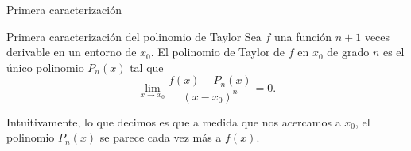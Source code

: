 \begin{frame}{Primera caracterización}
  \begin{exampleblock}{Primera caracterización del polinomio de Taylor}
    Sea $f$ una función $n+1$ veces derivable en un entorno de $x_0$.
    El polinomio de Taylor de $f$ en $x_0$ de grado $n$ es el único
    polinomio $P_n(x)$ tal que
    \[
      \lim_{x \to x_0} \frac{f(x)-P_n(x)}{(x-x_0)^n} = 0.
    \]
  \end{exampleblock}

  Intuitivamente, lo que decimos es que a medida que nos acercamos a $x_0$,
  el polinomio $P_n(x)$ se parece cada vez más a $f(x)$.
\end{frame}
